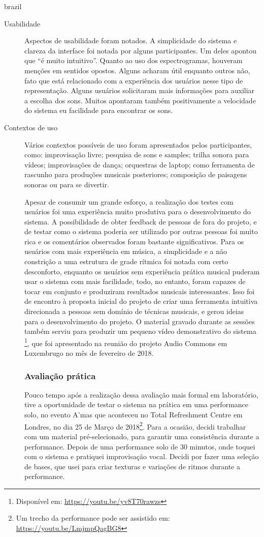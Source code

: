 \begin{otherlanguage*}{brazil}
\begin{description}
\item[Usabilidade] Aspectos de usabilidade foram notados. A simplicidade do sistema e clareza da interface foi notada por alguns participantes. Um deles apontou que ``é muito intuitivo''. Quanto ao uso dos espectrogramas, houveram menções em sentidos opostos. Alguns acharam útil enquanto outros não, fato que está relacionado com a experiência dos usuários nesse tipo de representação. Alguns usuários solicitaram mais informações para auxiliar a escolha dos sons. Muitos apontaram também positivamente a velocidade do sistema eu facilidade para encontrar os sons.

\item[Contextos de uso] Vários contextos possíveis de uso foram apresentados pelos participantes, como: improvisação livre; pesquisa de sons e samples; trilha sonora para vídeos; improvisações de dança; orquestras de laptop; como ferramenta de rascunho para produções musicais posteriores; composição de paisagens sonoras ou para se divertir.

Apesar de consumir um grande esforço, a realização dos testes com usuários foi uma experiência muito produtiva para o desenvolvimento do sistema. A possibilidade de obter feedback de pessoas de fora do projeto, e de testar como o sistema poderia ser utilizado por outras pessoas foi muito rica e os comentários observados foram bastante significativos. Para os usuários com mais experiência em música, a simplicidade e a não constrição a uma estrutura de grade rítmica foi notada com certo desconforto, enquanto os usuários sem experiência prática musical puderam usar o sistema com mais facilidade, todo, no entanto, foram capazes de tocar em conjunto e produziram resultados musicais interessantes. Isso foi de encontro à proposta inicial do projeto de criar uma ferramenta intuitiva direcionada a pessoas sem domínio de técnicas musicais, e gerou ideias para o desenvolvimento do projeto. O material gravado durante as sessões também serviu para produzir um pequeno vídeo demonstrativo do sistema \footnote{Disponível em: \url{https://youtu.be/yv8T70rawzs}}, que foi apresentado na reunião do projeto Audio Commons em Luxembrugo no mês de fevereiro de 2018. 



\subsubsection{Avaliação prática}

Pouco tempo após a realização dessa avaliação mais formal em laboratório, tive a oportunidade de testar o sistema na prática em uma performance solo, no evento A'mas que aconteceu no Total Refreshment Centre em Londres, no dia 25 de Março de 2018\footnote{Um trecho da performance pode ser assistido em: \url{https://youtu.be/LmjmpQagBG8}}. Para a ocasião, decidi trabalhar com um material pré-selecionado, para garantir uma consistência durante a performance. Depois de uma performance solo de 30 minutos, onde toquei com o sistema e pratiquei improvisação vocal. Decidi por fazer uma seleção de bases, que usei para criar texturas e variações de ritmos durante a performance. 


\end{description}
\end{otherlanguage*}
